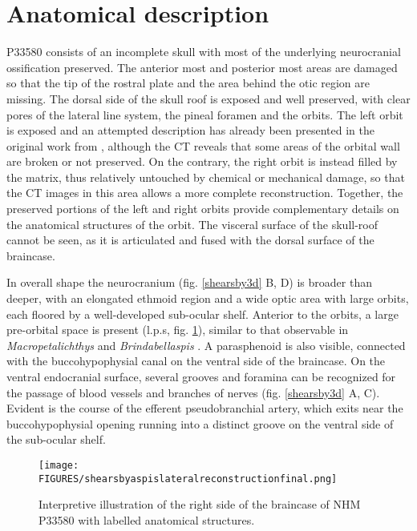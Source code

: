 \documentclass[11pt,letterpaper]{report}
\begin{document}
\section{Anatomical description}

P33580 consists of an incomplete skull with most of the underlying neurocranial ossification preserved. The anterior most and posterior most areas are damaged so that the tip of the rostral plate and the area behind the otic region are missing. The dorsal side of the skull roof is exposed and well preserved, with clear pores of the lateral line system, the pineal foramen and the orbits. The left orbit is exposed and an attempted description has already been presented in the original work from \cite{Young1985}, although the CT reveals that some areas of the orbital wall are broken or not preserved. On the contrary, the right orbit is instead filled by the matrix, thus relatively untouched by chemical or mechanical damage, so that the CT images in this area allows a more complete reconstruction. Together, the preserved portions of the left and right orbits provide complementary details on the anatomical structures of the orbit. The visceral surface of the skull-roof cannot be seen, as it is articulated and fused with the dorsal surface of the braincase. 

In overall shape the neurocranium (fig. \ref{shearsby3d} B, D) is broader than deeper, with an elongated ethmoid region and a wide optic area with large orbits, each floored by a well-developed sub-ocular shelf. Anterior to the orbits, a large pre-orbital space is present (l.p.s, fig. \ref{shearsbylateral}), similar to that observable in \textit{Macropetalichthys} \citep{Stensi1925,Stensi1969} and \textit{Brindabellaspis} \citep{Young1980}. A parasphenoid is also visible, connected with the buccohypophysial canal on the ventral side of the braincase. On the ventral endocranial surface, several grooves and foramina can be recognized for the passage of blood vessels and branches of nerves (fig. \ref{shearsby3d} A, C). Evident is the course of the efferent pseudobranchial artery, which exits near the buccohypophysial opening running into a distinct groove on the ventral side of the sub-ocular shelf. 

\begin{figure}[!h]
\centering
    \texttt{[image: FIGURES/shearsbyaspislateralreconstructionfinal.png]}
\caption{\footnotesize{Interpretive illustration of the right side of the braincase of NHM P33580 with labelled anatomical structures.}}
\label{shearsbylateral}
\end{figure}
\end{document}
